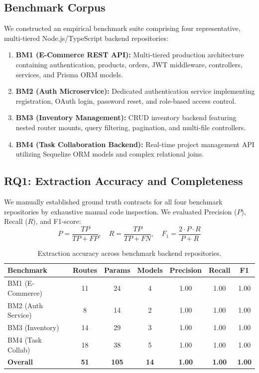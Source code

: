 \documentclass[a4paper,10pt]{article}
\begin{document}
\subsection{Benchmark Corpus}
\noindent
We constructed an empirical benchmark suite comprising four representative, multi-tiered Node.js/TypeScript backend repositories:
\begin{enumerate}
  \setlength{\itemsep}{1pt}
  \item \textbf{BM1 (E-Commerce REST API):} Multi-tiered production architecture containing authentication, products, orders, JWT middleware, controllers, services, and Prisma ORM models.
  \item \textbf{BM2 (Auth Microservice):} Dedicated authentication service implementing registration, OAuth login, password reset, and role-based access control.
  \item \textbf{BM3 (Inventory Management):} CRUD inventory backend featuring nested router mounts, query filtering, pagination, and multi-file controllers.
  \item \textbf{BM4 (Task Collaboration Backend):} Real-time project management API utilizing Sequelize ORM models and complex relational joins.
\end{enumerate}

\subsection{RQ1: Extraction Accuracy and Completeness}
\noindent
We manually established ground truth contracts for all four benchmark repositories by exhaustive manual code inspection. We evaluated Precision ($P$), Recall ($R$), and F1-score:
\begin{equation}
P = \frac{TP}{TP + FP}, \quad R = \frac{TP}{TP + FN}, \quad F_1 = \frac{2 \cdot P \cdot R}{P + R}
\end{equation}

\begin{table}[t]
\caption{Extraction accuracy across benchmark backend repositories.}
\label{tab:accuracy}
\centering
\fontsize{7.5pt}{9.5pt}\selectfont
\begin{tabular}{lcccccc}
\toprule
\textbf{Benchmark} & \textbf{Routes} & \textbf{Params} & \textbf{Models} & \textbf{Precision} & \textbf{Recall} & \textbf{F1} \\
\midrule
BM1 (E-Commerce)   & 11 & 24 & 4 & 1.00 & 1.00 & 1.00 \\
BM2 (Auth Service) & 8  & 14 & 2 & 1.00 & 1.00 & 1.00 \\
BM3 (Inventory)    & 14 & 29 & 3 & 1.00 & 1.00 & 1.00 \\
BM4 (Task Collab)  & 18 & 38 & 5 & 1.00 & 1.00 & 1.00 \\
\midrule
\textbf{Overall}   & \textbf{51} & \textbf{105} & \textbf{14} & \textbf{1.00} & \textbf{1.00} & \textbf{1.00} \\
\bottomrule
\end{tabular}
\end{table}
\end{document}
